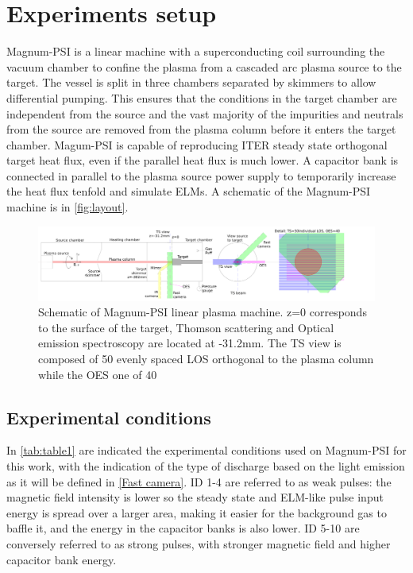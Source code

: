 \section{Experiments setup}\label{Experiments setup}

Magnum-PSI is a linear machine with a superconducting coil surrounding the vacuum chamber to confine the plasma from a cascaded arc plasma source to the target. The vessel is split in three chambers separated by skimmers to allow differential pumping. This ensures that the conditions in the target chamber are independent from the source and the vast majority of the impurities and neutrals from the source are removed from the plasma column before it enters the target chamber. \cite{Scholten2013} Magum-PSI is capable of reproducing ITER steady state orthogonal target heat flux, even if the parallel heat flux is much lower. \cite{Scholten2013} A capacitor bank is connected in parallel to the plasma source power supply to temporarily increase the heat flux tenfold and simulate ELMs. \cite{Morgan2014} A schematic of the Magnum-PSI machine is in \autoref{fig:layout}.

\begin{figure}
	\centering
	\includegraphics[width=\linewidth,trim={30 0 450 0},clip]{Chapters/chapter3/figs/layout_4.png}
	\caption{Schematic of Magnum-PSI linear plasma machine. z=0 corresponds to the surface of the target, Thomson scattering and Optical emission spectroscopy are located at -31.2mm. The TS view is composed of 50 evenly spaced LOS orthogonal to the plasma column while the OES one of 40}
	\label{fig:layout}
\end{figure}


\subsection{Experimental conditions}\label{Experimental conditions}

In \autoref{tab:table1} are indicated the experimental conditions used on Magnum-PSI for this work, with the indication of the type of discharge based on the light emission as it will be defined in \autoref{Fast camera}. ID 1-4 are referred to as weak pulses: the magnetic field intensity is lower so the steady state and ELM-like pulse input energy is spread over a larger area, making it easier for the background gas to baffle it, and the energy in the capacitor banks is also lower. ID 5-10 are conversely referred to as strong pulses, with stronger magnetic field and higher capacitor bank energy.



